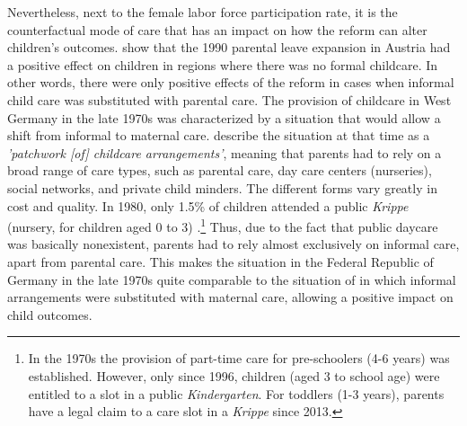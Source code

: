 \documentclass[11pt, a4paper]{article} %
\begin{document}
Nevertheless, next to the female labor force participation rate, it is the counterfactual mode of care that has an impact on how the reform can alter children's outcomes. \cite{danzer2017parental} show that the 1990 parental leave expansion in Austria had a positive effect on children in regions where there was no formal childcare. In other words, there were only positive effects of the reform in cases when informal child care was substituted with parental care. The provision of childcare in West Germany in the late 1970s was characterized by a situation that would allow a shift from informal to maternal care. \cite{hank2001childcare} describe the situation at that time as a \textit{'patchwork [of] childcare arrangements'}, meaning that parents had to rely on a broad range of care types, such as parental care, day care centers (nurseries), social networks, and private child minders. The different forms vary greatly in cost and quality. In 1980, only 1.5\% of children attended a public \textit{Krippe} (nursery, for children aged 0 to 3) \citep[p.~34]{bildungsbericht2006}.\footnote{In the 1970s the provision of part-time care for pre-schoolers (4-6 years) was established. However, only since 1996, children (aged 3 to school age) were entitled to a slot in a public \textit{Kindergarten}. For toddlers (1-3 years), parents have a legal claim to a care slot in a \textit{Krippe} since 2013.} Thus, due to the fact that public daycare was basically nonexistent, parents had to rely almost exclusively on informal care, apart from parental care. This makes the situation in the Federal Republic of Germany in the late 1970s quite comparable to the situation of \cite{danzer2017parental} in which informal arrangements were substituted with maternal care, allowing a positive impact on child outcomes.



\bigskip
\end{document}
